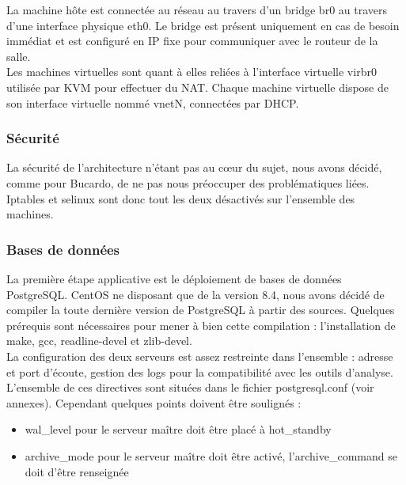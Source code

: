 \documentclass[12pt]{report}
\begin{document}
La machine hôte est connectée au réseau au travers d’un bridge br0 au travers d’une
interface physique eth0. Le bridge est présent uniquement en cas de besoin immédiat
et est configuré en IP fixe pour communiquer avec le routeur de la salle.\\

Les machines virtuelles sont quant à elles reliées à l’interface virtuelle virbr0 utilisée
par KVM pour effectuer du NAT. Chaque machine virtuelle dispose de son interface
virtuelle nommé vnetN, connectées par DHCP.\\

\subsubsection{Sécurité}

La sécurité de l'architecture n'étant pas au cœur du sujet, nous avons décidé, comme
pour Bucardo, de ne pas nous préoccuper des problématiques liées. Iptables et
selinux sont donc tout les deux désactivés sur l'ensemble des machines. \\

\subsubsection{Bases de données}

La première étape applicative est le déploiement de bases de données
PostgreSQL. CentOS ne disposant que de la version 8.4, nous avons décidé de
compiler la toute dernière version de PostgreSQL à partir des sources. Quelques
prérequis sont nécessaires pour mener à bien cette compilation : l'installation
de make, gcc, readline-devel et zlib-devel.\\

La configuration des deux serveurs est assez restreinte dans l'ensemble :
adresse et port d'écoute, gestion des logs pour la compatibilité avec les outils
d'analyse. L'ensemble de ces directives sont situées dans le fichier
postgresql.conf (voir annexes). Cependant quelques points doivent être
soulignés :\\

\begin{itemize}
\item wal\_level pour le serveur maître doit être placé à hot\_standby
\item archive\_mode pour le serveur maître doit être activé, l'archive\_command se
doit d'être renseignée
\end{itemize}
\end{document}
